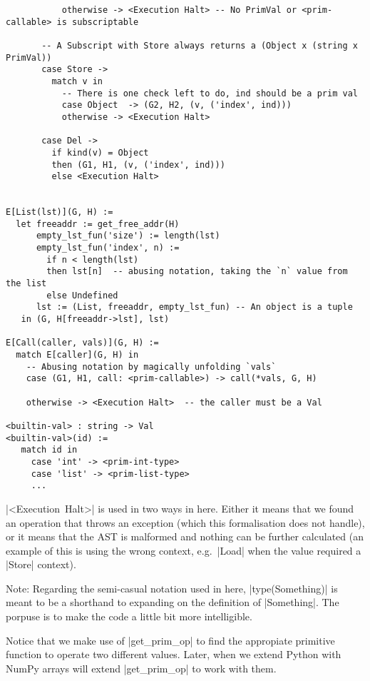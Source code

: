 \begin{verbatim}
           otherwise -> <Execution Halt> -- No PrimVal or <prim-callable> is subscriptable

       -- A Subscript with Store always returns a (Object x (string x PrimVal))
       case Store ->
         match v in
           -- There is one check left to do, ind should be a prim val
           case Object  -> (G2, H2, (v, ('index', ind)))
           otherwise -> <Execution Halt>

       case Del ->
         if kind(v) = Object
         then (G1, H1, (v, ('index', ind)))
         else <Execution Halt>


E[List(lst)](G, H) :=
  let freeaddr := get_free_addr(H)
      empty_lst_fun('size') := length(lst)
      empty_lst_fun('index', n) :=
        if n < length(lst)
        then lst[n]  -- abusing notation, taking the `n` value from the list
        else Undefined
      lst := (List, freeaddr, empty_lst_fun) -- An object is a tuple
   in (G, H[freeaddr->lst], lst)

E[Call(caller, vals)](G, H) :=
  match E[caller](G, H) in
    -- Abusing notation by magically unfolding `vals`
    case (G1, H1, call: <prim-callable>) -> call(*vals, G, H)

    otherwise -> <Execution Halt>  -- the caller must be a Val

<builtin-val> : string -> Val
<builtin-val>(id) :=
   match id in
     case 'int' -> <prim-int-type>
     case 'list' -> <prim-list-type>
     ...
\end{verbatim}

\pycode|<Execution\ Halt>| is used in two ways in
here. Either it means that we found an operation that throws an
exception (which this formalisation does not handle), or it means that
the AST is malformed and nothing can be further calculated (an example
of this is using the wrong context, e.g.~\pycode|Load| when the value
required a \pycode|Store| context).

Note: Regarding the semi-casual notation used in here,
\pycode|type(Something)| is meant to be a shorthand to expanding on the
definition of \pycode|Something|. The porpuse is to make the code a
little bit more intelligible.

Notice that we make use of \pycode|get_prim_op| to find the appropiate
primitive function to operate two different values. Later, when we
extend Python with NumPy arrays will extend \pycode|get_prim_op| to
work with them.

